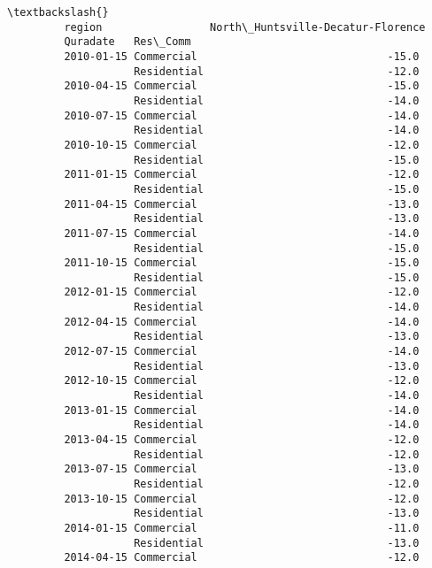 \documentclass[11pt]{article}
\begin{document}
\begin{Verbatim}[commandchars=\\\{\}]
                                                                   \textbackslash{}
         region                 North\_Huntsville-Decatur-Florence   
         Quradate   Res\_Comm                                        
         2010-01-15 Commercial                              -15.0   
                    Residential                             -12.0   
         2010-04-15 Commercial                              -15.0   
                    Residential                             -14.0   
         2010-07-15 Commercial                              -14.0   
                    Residential                             -14.0   
         2010-10-15 Commercial                              -12.0   
                    Residential                             -15.0   
         2011-01-15 Commercial                              -12.0   
                    Residential                             -15.0   
         2011-04-15 Commercial                              -13.0   
                    Residential                             -13.0   
         2011-07-15 Commercial                              -14.0   
                    Residential                             -15.0   
         2011-10-15 Commercial                              -15.0   
                    Residential                             -15.0   
         2012-01-15 Commercial                              -12.0   
                    Residential                             -14.0   
         2012-04-15 Commercial                              -14.0   
                    Residential                             -13.0   
         2012-07-15 Commercial                              -14.0   
                    Residential                             -13.0   
         2012-10-15 Commercial                              -12.0   
                    Residential                             -14.0   
         2013-01-15 Commercial                              -14.0   
                    Residential                             -14.0   
         2013-04-15 Commercial                              -12.0   
                    Residential                             -12.0   
         2013-07-15 Commercial                              -13.0   
                    Residential                             -12.0   
         2013-10-15 Commercial                              -12.0   
                    Residential                             -13.0   
         2014-01-15 Commercial                              -11.0   
                    Residential                             -13.0   
         2014-04-15 Commercial                              -12.0   

\end{Verbatim}
\end{document}
